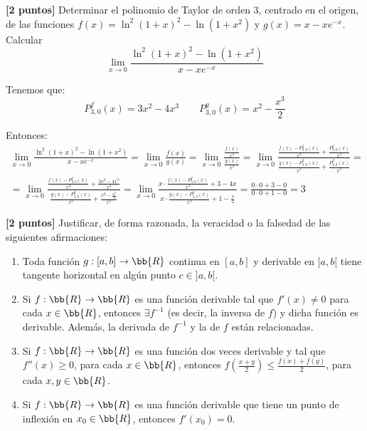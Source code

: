 \documentclass[12pt]{article}
\begin{document}
\begin{ejercicio}\textbf{[2 puntos]}
    Determinar el polinomio de Taylor de orden 3, centrado en el origen, de las funciones $f(x)=\ln^2(1+x)^2-\ln(1+x^2)$ y $g(x)=x-xe^{-x}$. Calcular
    \begin{equation*}
        \lim_{x\to 0} \frac{\ln^2(1+x)^2-\ln(1+x^2)}{x-xe^{-x}}
    \end{equation*}


    Tenemos que:
    \begin{equation*}
        P_{3,0}^f(x) = 3x^2-4x^3
        \qquad
        P_{3,0}^g(x) = x^2-\frac{x^3}{2}
    \end{equation*}

    Entonces:
    \begin{multline*}
        \lim_{x\to 0} \frac{\ln^2(1+x)^2-\ln(1+x^2)}{x-xe^{-x}}
        = \lim_{x\to 0} \frac{f(x)}{g(x)}
        = \lim_{x\to 0} \frac{\displaystyle \frac{f(x)}{x^2}}{\displaystyle \frac{g(x)}{x^2}}
        = \lim_{x\to 0} \frac{\displaystyle \frac{f(x)-P_{3,0}^f(x)}{x^2} +\frac{P_{3,0}^f(x)}{x^2}}{\displaystyle \frac{g(x)-P_{3,0}^g(x)}{x^2} +\frac{P_{3,0}^g(x)}{x^2}} =\\
        = \lim_{x\to 0} \frac{\displaystyle \frac{f(x)-P_{3,0}^f(x)}{x^2} +\frac{3x^2-4x^3}{x^2}}{\displaystyle \frac{g(x)-P_{3,0}^g(x)}{x^2} +\frac{x^2-\frac{x^3}{2}}{x^2}}
        = \lim_{x\to 0} \frac{\displaystyle x\cdot \frac{f(x)-P_{3,0}^f(x)}{x^3} +3-4x}{\displaystyle x\cdot \frac{g(x)-P_{3,0}^g(x)}{x^3} +1-\frac{x}{2}}
        =
        \frac{0\cdot 0 +3-0}{0\cdot 0 +1-0} = 3
    \end{multline*}
\end{ejercicio}

\begin{ejercicio}\textbf{[2 puntos]} Justificar, de forma razonada, la veracidad o la falsedad de las siguientes afirmaciones:
\begin{enumerate}
    \item Toda función $g:[a,b]\to \bb{R}$ continua en $[a,b]$ y derivable en $]a,b[$ tiene tangente horizontal en algún punto $c\in ]a,b[$.

    \item Si $f:\bb{R}\to \bb{R}$ es una función derivable tal que $f'(x)\neq 0$ para cada $x\in \bb{R}$, entonces $\exists f^{-1}$ (es decir, la inversa de $f$) y dicha función es derivable. Además, la derivada de $f^{-1}$ y la de $f$ están relacionadas.

    \item Si $f:\bb{R}\to \bb{R}$ es una función dos veces derivable y tal que $f''(x)\geq 0$, para cada $x\in \bb{R}$, entonces $f\left(\frac{x+y}{2}\right)\leq \frac{f(x)+f(y)}{2}$, para cada $x,y\in \bb{R}$.

    \item Si $f:\bb{R}\to \bb{R}$ es una función derivable que tiene un punto de inflexión en $x_0\in \bb{R}$, entonces $f'(x_0)=0$.
\end{enumerate}
\end{ejercicio}
\end{document}
